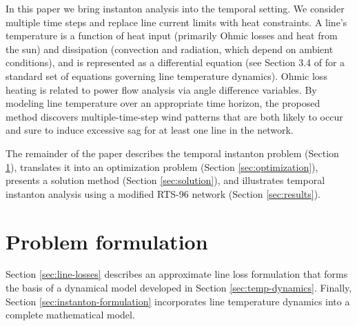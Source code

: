 \documentclass[conference]{IEEEtran}
\begin{document}
In this paper we bring instanton analysis into the temporal
setting. We consider multiple time steps and replace line current
limits with heat constraints. A line's temperature is a function of
heat input (primarily Ohmic losses and heat from the sun) and
dissipation (convection and radiation, which depend on ambient
conditions), and is represented as a differential equation (see
Section 3.4 of \cite{ieee2007} for a standard set of equations
governing line temperature dynamics). Ohmic loss heating is related to
power flow analysis via angle difference variables. By modeling line
temperature over an appropriate time horizon, the proposed method
discovers multiple-time-step wind patterns that are both likely to
occur and sure to induce excessive sag for at least one line in the
network.

The remainder of the paper describes the temporal instanton problem (Section \ref{sec:problem}), translates it into an optimization problem (Section \ref{sec:optimization}), presents a solution method (Section \ref{sec:solution}), and illustrates temporal instanton analysis using a modified RTS-96 network (Section \ref{sec:results}).

\section{Problem formulation}\label{sec:problem}

Section \ref{sec:line-losses} describes an approximate line loss formulation that forms the basis of a dynamical model developed in Section \ref{sec:temp-dynamics}. Finally, Section \ref{sec:instanton-formulation} incorporates line temperature dynamics into a complete mathematical model.

\end{document}
